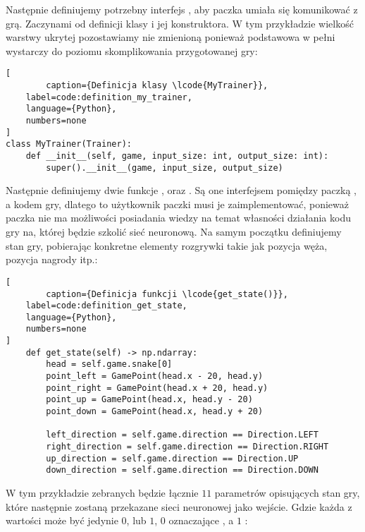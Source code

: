Następnie definiujemy potrzebny interfejs , aby paczka  umiała się komunikować z grą. Zaczynami od definicji klasy i jej konstruktora. W tym przykładzie wielkość warstwy ukrytej pozostawiamy nie zmienioną ponieważ podstawowa w pełni wystarczy do poziomu skomplikowania przygotowanej gry:

\begin{onepage}
    \begin{lstlisting}[
        caption={Definicja klasy \lcode{MyTrainer}},
    label=code:definition_my_trainer,
    language={Python},
    numbers=none
]
class MyTrainer(Trainer):
    def __init__(self, game, input_size: int, output_size: int):
        super().__init__(game, input_size, output_size)
    \end{lstlisting}
\end{onepage}

Następnie definiujemy dwie funkcje , oraz . Są one interfejsem pomiędzy paczką , a kodem gry, dlatego to użytkownik paczki musi je zaimplementować, ponieważ paczka nie ma możliwości posiadania wiedzy na temat własności działania kodu gry na, której będzie szkolić sieć neuronową. Na samym początku definiujemy stan gry, pobierając konkretne elementy rozgrywki takie jak pozycja węża, pozycja nagrody itp.:

\begin{onepage}
    \begin{lstlisting}[
        caption={Definicja funkcji \lcode{get_state()}},
    label=code:definition_get_state,
    language={Python},
    numbers=none
]
    def get_state(self) -> np.ndarray:
        head = self.game.snake[0]
        point_left = GamePoint(head.x - 20, head.y)
        point_right = GamePoint(head.x + 20, head.y)
        point_up = GamePoint(head.x, head.y - 20)
        point_down = GamePoint(head.x, head.y + 20)

        left_direction = self.game.direction == Direction.LEFT
        right_direction = self.game.direction == Direction.RIGHT
        up_direction = self.game.direction == Direction.UP
        down_direction = self.game.direction == Direction.DOWN
    \end{lstlisting}
\end{onepage}

W tym przykładzie zebranych będzie łącznie $11$ parametrów opisujących stan gry, które następnie zostaną przekazane sieci neuronowej jako wejście. Gdzie każda z wartości może być jedynie $0$, lub $1$, $0$ oznaczające , a $1$ :

